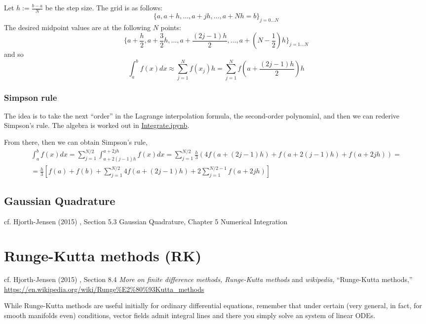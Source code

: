 \documentclass[10pt]{amsart}
\begin{document}
\begin{multicols*}{2}
Let $h := \frac{b-a}{N}$ be the step size.  The grid is as follows:
\[
\lbrace a , a +h , \dots , a + jh , \dots , a+Nh = b\rbrace_{j=0\dots N}
\]
The desired midpoint values are at the following $N$ points:
\[
\lbrace a + \frac{h}{2} , a + \frac{3}{2} h , \dots , a+\frac{(2j-1 ) h }{2} , \dots , a + \left( N - \frac{1}{2} \right) h \rbrace_{j=1 \dots N}
\]
and so
\begin{equation}
  \int_a^b f(x) dx \approx \sum_{j=1}^N f(x_j) h = \sum_{j=1}^N f\left( a + \frac{(2j-1) h}{2} \right)h 
\end{equation}


\subsubsection{Simpson rule}

The idea is to take the next ``order'' in the Lagrange interpolation formula, the second-order polynomial, and then we can rederive Simpson's rule.  The algebra is worked out in \href{https://github.com/ernestyalumni/CompPhys/blob/master/Cpp/Integrate.ipynb}{Integrate.ipynb}.

From there, then we can obtain Simpson's rule,
\[
\begin{gathered}
  \int_a^b f(x)dx = \sum_{j=1}^{N/2} \int_{a + 2(j-1)h }^{a+2jh} f(x) dx = \sum_{j=1}^{N/2} \frac{h}{3} ( 4 f(a+(2j-1)h ) + f(a+2(j-1)h) + f(a+2jh) ) = \\
  = \frac{h}{3} \left[ f(a) + f(b) + \sum_{j=1}^{N/2} 4f(a+(2j-1) h) + 2\sum_{j=1}^{N/2-1} f(a+2jh) \right]
\end{gathered}
\]

\subsection{Gaussian Quadrature}

cf. Hjorth-Jensen (2015) \cite{Hjor2015}, Section 5.3 Gaussian Quadrature, Chapter 5 Numerical Integration


\section{Runge-Kutta methods (RK) }

cf. Hjorth-Jensen (2015) \cite{Hjor2015}, Section 8.4 \emph{More on finite difference methods, Runge-Kutta methods} and \emph{wikipedia}, ``Runge-Kutta methods,'' \url{https://en.wikipedia.org/wiki/Runge\%E2\%80\%93Kutta_methods}

While Runge-Kutta methods are useful initially for ordinary differential equations, remember that under certain (very general, in fact, for smooth manifolds even) conditions, vector fields admit integral lines and there you simply solve an system of linear ODEs.  



\end{multicols*}
\end{document}
